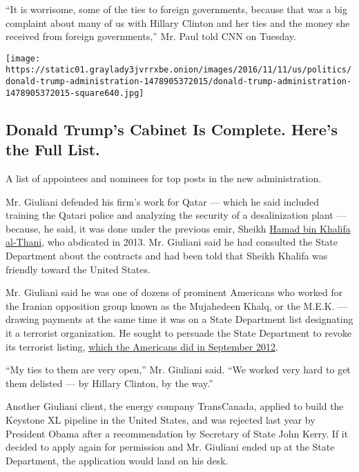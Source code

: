 ``It is worrisome, some of the ties to foreign governments, because that
was a big complaint about many of us with Hillary Clinton and her ties
and the money she received from foreign governments,'' Mr. Paul told CNN
on Tuesday.

\href{https://www.nytimes3xbfgragh.onion/interactive/2016/us/politics/donald-trump-administration.html}{}

\texttt{[image: https://static01.graylady3jvrrxbe.onion/images/2016/11/11/us/politics/donald-trump-administration-1478905372015/donald-trump-administration-1478905372015-square640.jpg]}

\hypertarget{donald-trumps-cabinet-is-complete-heres-the-full-list}{%
\subsection{Donald Trump's Cabinet Is Complete. Here's the Full
List.}\label{donald-trumps-cabinet-is-complete-heres-the-full-list}}

A list of appointees and nominees for top posts in the new
administration.

Mr. Giuliani defended his firm's work for Qatar --- which he said
included training the Qatari police and analyzing the security of a
desalinization plant --- because, he said, it was done under the
previous emir, Sheikh
\href{https://en.wikipedia.org/wiki/Hamad_bin_Khalifa_Al_Thanihttps://www.nytimes3xbfgragh.onion/2016/10/25/world/middleeast/sheikh-khalifa-bin-hamad-al-thani-former-emir-of-qatar-dies-at-84.html}{Hamad
bin Khalifa al-Thani}, who abdicated in 2013. Mr. Giuliani said he had
consulted the State Department about the contracts and had been told
that Sheikh Khalifa was friendly toward the United States.

Mr. Giuliani said he was one of dozens of prominent Americans who worked
for the Iranian opposition group known as the Mujahedeen Khalq, or the
M.E.K. --- drawing payments at the same time it was on a State
Department list designating it a terrorist organization. He sought to
persuade the State Department to revoke its terrorist listing,
\href{http://www.state.gov/r/pa/prs/ps/2012/09/198443.htm}{which the
Americans did in September 2012}.

``My ties to them are very open,'' Mr. Giuliani said. ``We worked very
hard to get them delisted --- by Hillary Clinton, by the way.''

Another Giuliani client, the energy company TransCanada, applied to
build the Keystone XL pipeline in the United States, and was rejected
last year by President Obama after a recommendation by Secretary of
State John Kerry. If it decided to apply again for permission and Mr.
Giuliani ended up at the State Department, the application would land on
his desk.

